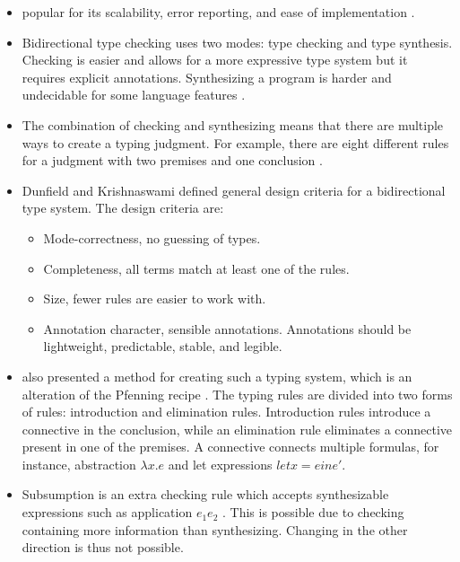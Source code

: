\begin{itemize}
    \item popular for its scalability, error reporting, and ease of implementation \citep{bidir-gadts}.
    \item Bidirectional type checking uses two modes: type checking and type synthesis. Checking is easier and allows for a more expressive type system but it requires explicit annotations. Synthesizing a program is harder and undecidable for some language features \citep{bidir}.
    \item The combination of checking and synthesizing means that there are multiple ways to create a typing judgment. For example, there are eight different rules for a judgment with two premises and one conclusion \citep{bidir}.   
   \item Dunfield and Krishnaswami \citep{bidir} defined general design criteria for a bidirectional type system. The design criteria are:
   \begin{itemize}
       \item Mode-correctness, no guessing of types.
       \item Completeness, all terms match at least one of the rules.
       \item Size, fewer rules are easier to work with.
       \item Annotation character, sensible annotations. Annotations should be lightweight, predictable, stable, and legible.
   \end{itemize}
   \item \citep{bidir} also presented a method for creating such a typing system, which is an alteration of the Pfenning recipe \citep{pfenning-recipe}. 
   The typing rules are divided into two forms of rules: introduction and elimination rules. Introduction rules introduce a connective in the conclusion, while an elimination rule eliminates a connective present in one of the premises. A connective connects multiple formulas, for instance, abstraction $\lambda x. e$ and let expressions $let x = e in e'$.
   \item Subsumption is an extra checking rule which accepts synthesizable expressions such as application $e_1 e_2$ \citep{bidir}. This is possible due to checking containing more information than synthesizing. Changing in the other direction is thus not possible. 
   
   
\end{itemize}